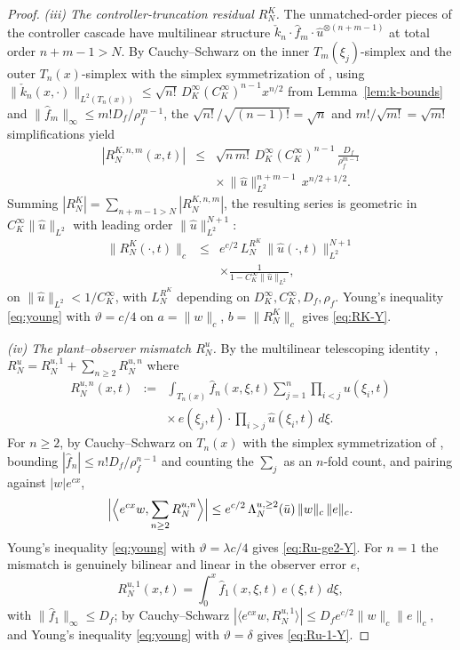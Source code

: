 \documentclass[journal,twoside,web]{ieeecolor}
\begin{document}
\begin{proof}
\emph{(iii) The controller-truncation residual $R^K_N$.} The unmatched-order pieces of the controller cascade have multilinear structure $\check k_n\cdot\hat f_m\cdot\hat u^{\otimes(n+m-1)}$ at total order $n+m-1>N$. By Cauchy--Schwarz on the inner $T_m(\xi_j)$-simplex and the outer $T_n(x)$-simplex with the simplex symmetrization of \cite{HV2}, using $\|\check k_n(x,\cdot)\|_{L^2(T_n(x))}\le\sqrt{n!}\,D_K^\infty(C_K^\infty)^{n-1}x^{n/2}$ from Lemma~\ref{lem:k-bounds} and $\|\hat f_m\|_\infty\le m!D_f/\rho_f^{m-1}$, the $\sqrt{n!}/\sqrt{(n-1)!}=\sqrt{n}$ and $m!/\sqrt{m!}=\sqrt{m!}$ simplifications yield
\begin{eqnarray}
|R^{K,n,m}_N(x,t)| &\le& \sqrt{n\,m!}\,D_K^\infty(C_K^\infty)^{n-1}\,\frac{D_f}{\rho_f^{m-1}} \nonumber\\
&& \times\,\|\hat u\|^{n+m-1}_{L^2}\,x^{n/2+1/2}. \label{eq:RK-piece-bd}
\end{eqnarray}
Summing $|R^K_N|=\sum_{n+m-1>N}|R^{K,n,m}_N|$, the resulting series is geometric in $C_K^\infty\|\hat u\|_{L^2}$ with leading order $\|\hat u\|^{N+1}_{L^2}$:
\begin{eqnarray}
\|R^K_N(\cdot,t)\|_c &\le& e^{c/2}\,L^{R^K}_N\,\|\hat u(\cdot,t)\|_{L^2}^{N+1} \nonumber\\
&& \times\frac{1}{1-C_K^\infty\|\hat u\|_{L^2}}, \label{eq:RK-state}
\end{eqnarray}
on $\|\hat u\|_{L^2}<1/C_K^\infty$, with $L^{R^K}_N$ depending on $D_K^\infty,C_K^\infty,D_f,\rho_f$. Young's inequality \eqref{eq:young} with $\vartheta=c/4$ on $a=\|w\|_c$, $b=\|R^K_N\|_c$ gives \eqref{eq:RK-Y}.

\emph{(iv) The plant--observer mismatch $R^u_N$.} By the multilinear telescoping identity \cite[eq.~(37)]{HV2}, $R^u_N=R^{u,1}_N+\sum_{n\ge 2}R^{u,n}_N$ where
\begin{eqnarray}
R^{u,n}_N(x,t) &:=& \int_{T_n(x)}\hat f_n(x,\xi,t)\sum_{j=1}^n\!\prod_{i<j}u(\xi_i,t) \nonumber\\
&& \times\,e(\xi_j,t)\cdot\prod_{i>j}\hat u(\xi_i,t)\,d\xi. \label{eq:Run-def}
\end{eqnarray}
For $n\ge 2$, by Cauchy--Schwarz on $T_n(x)$ with the simplex symmetrization of \cite{HV2}, bounding $|\hat f_n|\le n!D_f/\rho_f^{n-1}$ and counting the $\sum_j$ as an $n$-fold count, and pairing against $|w|e^{cx}$,
\begin{equation}\label{eq:Ru-ge2}
\Bigl|\Bigl\langle e^{cx}w,\sum_{n\ge 2}R^{u,n}_N\Bigr\rangle\Bigr|\le e^{c/2}\,\Lambda^{u,\ge 2}_N(\bar u)\,\|w\|_c\,\|e\|_c.
\end{equation}
Young's inequality \eqref{eq:young} with $\vartheta=\lambda c/4$ gives \eqref{eq:Ru-ge2-Y}. For $n=1$ the mismatch is genuinely bilinear and linear in the observer error $e$,
\begin{equation}\label{eq:Ru1-explicit}
R^{u,1}_N(x,t)=\int_0^x\hat f_1(x,\xi,t)\,e(\xi,t)\,d\xi,
\end{equation}
with $\|\hat f_1\|_\infty\le D_f$; by Cauchy--Schwarz $|\langle e^{cx}w,R^{u,1}_N\rangle|\le D_f e^{c/2}\|w\|_c\|e\|_c$, and Young's inequality \eqref{eq:young} with $\vartheta=\delta$ gives \eqref{eq:Ru-1-Y}.


\end{proof}
\end{document}
